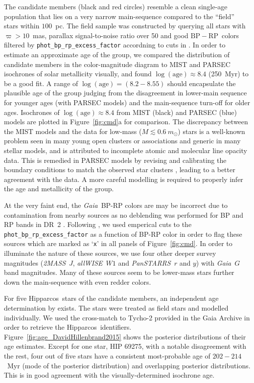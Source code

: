 \documentclass[modern,letterpaper]{aastex61}
\newcommand{\project}[1]{\textsl{#1}}
\newcommand{\acronym}[1]{{\small{#1}}}
\newcommand{\hipparcos}{Hipparcos}
\newcommand{\gaia}{\project{Gaia}}
\newcommand{\tmass}{\project{\acronym{2MASS}}}
\newcommand{\allwise}{\project{\acronym{allWISE}}}
\newcommand{\panstarrs}{\project{\acronym{PanSTARRS}}}
\newcommand{\figname}{Figure}
\newcommand{\bprp}{\ensuremath{\mathrm{BP}-\mathrm{RP}}}
\begin{document}
The candidate members (black and red circles) resemble a clean single-age population
that lies on a very narrow main-sequence compared to the ``field'' stars within $100$~pc.
The field sample was constructed by querying all stars with $\varpi>10$~mas,
parallax signal-to-noise ratio over 50 and good \bprp\ colors filtered by
\texttt{phot\_bp\_rp\_excess\_factor} accordning to cuts in \citet{2018arXiv180409378G}.
In order to estimate an approximate age of the group,
we compared the distribution of candidate members in the color-magnitude diagram
to MIST \citep[][with rotation]{2016ApJ...823..102C} and
PARSEC isochrones \citep[v1.2S;][]{2012MNRAS.427..127B,2015MNRAS.452.1068C}
of solar metallicity visually,
and found $\log(\mathrm{age}) \approx 8.4$ (250~Myr) to be a good fit.
A range of $\log(\mathrm{age}) = (8.2-8.55)$ should encapsulate the plausible
age of the group judging from the disagreement in lower-main sequence for
younger ages (with PARSEC models) and the main-sequence turn-off for older ages.
Isochrones of $\log(\mathrm{age}) \approx 8.4$
from MIST (black) and PARSEC (blue) models are plotted in \figname~\ref{fig:cmd}a
for comparison.
The discrepancy between the MIST models and the data for low-mass
($M\lesssim0.6~m_\odot$) stars is a well-known problem seen in many young open
clusters or associations and generic in many stellar models, and is attributed
to incomplete atomic and molecular line opacity data.
This is remedied in PARSEC models by revising and calibrating the boundary
conditions to match the observed star clusters
\citep{2014MNRAS.444.2525C}, leading to a better agreement with the data.
A more careful modelling is required to properly infer the age and metallicity
of the group.

At the very faint end, the \gaia\ BP-RP colors are may be incorrect due to
contamination from nearby sources as no deblending was performed for BP and RP
bands in DR~2 \citep{2018arXiv180409368E}.
Following \citet{2018arXiv180409378G}, we used emperical cuts to the
\texttt{phot\_bp\_rp\_excess\_factor} as a function of BP-RP color in order to
flag these sources which are marked as `\texttt{x}' in all panels of
Figure~\ref{fig:cmd}.
In order to illuminate the nature of these sources, we use four other deeper
survey magnitudes (\tmass\ $J$, \allwise\ $W1$ and \panstarrs\ $r$ and $y$) with
\gaia\ $G$ band magnitudes.
%
Many of these sources seem to be lower-mass stars further down the main-sequence
with even redder colors.

For five \hipparcos\ stars of the candidate members,
an independent age determination by \citet{2015ApJ...804..146D} exists.
The stars were treated as field stars and modelled individually.
We used the cross-match to Tycho-2 provided in the Gaia Archive
in order to retrieve the \hipparcos\ identifiers.
Figure~\ref{fig:age_DavidHillenbrand2015} shows the posterior distributions
of their age estimates.
Except for one star, HIP 69275, with a notable disagreement with the rest,
four out of five stars have a consistent most-probable age of $202-214$~Myr
(mode of the posterior distribution) and overlapping posterior distributions.
This is in good agreement with the visually-determined isochrone age.
\end{document}
